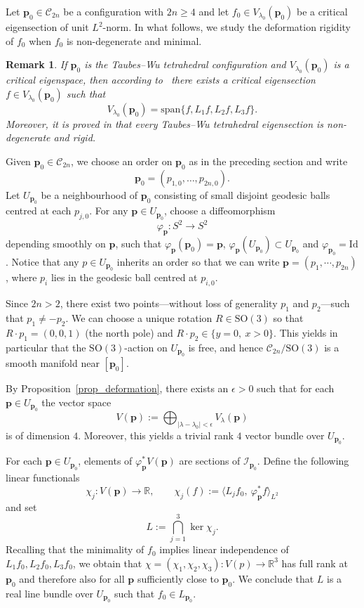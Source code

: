 \documentclass[11pt]{amsart}
\newtheorem*{remark}{Remark}
\newcommand{\MC}{\mathcal{C}}
\newcommand{\vp}{\varphi}
\newcommand{\MI}{\mathcal{I}}
\newcommand{\Id}{\mathrm{Id}}
\newcommand{\SO}{\mathrm{SO}}
\newcommand{\mbp}{\mathbf{p}}
\begin{document}
Let $\mbp_0\in \MC_{2n}$ be a configuration with $2n\geq 4$ and let $f_0\in V_{\lambda_0}(\mbp_0)$ be a critical eigensection of unit $L^2$-norm.  
In what follows, we study the deformation rigidity of $f_0$ when $f_0$ is non-degenerate and minimal.  

\begin{remark}
	If $\mbp_0$ is the Taubes--Wu tetrahedral configuration and $V_{\lambda_0}(\mbp_0)$ is a critical eigenspace, then according to~\cite[Section~5]{chen2024existence} there exists a critical eigensection $f\in V_{\lambda_0}(\mbp_0)$ such that
	\[
	V_{\lambda_0}(\mbp_0)=\mathrm{span}\{f, L_1 f, L_2 f, L_3 f\}.
	\]
	Moreover, it is proved in \cite{chen2024existence} that every Taubes--Wu tetrahedral eigensection is non-degenerate and rigid.
\end{remark}

Given $\mbp_0\in\mathcal{C}_{2n}$, we choose an order on $\mbp_0$ as in the preceding section and write
\[
\mbp_0=(p_{1,0},\ldots,p_{2n,0}).
\]
Let $U_{\mbp_0}$ be a neighbourhood of $\mbp_0$ consisting of small disjoint geodesic balls centred at each $p_{j,0}$.  
For any $\mbp\in U_{\mbp_0}$, choose a diffeomorphism
\[
\varphi_{\mbp}: S^2\to S^2
\]
depending smoothly on $\mbp$, such that $\varphi_{\mbp}(\mbp_0)=\mbp$, $\vp_{\mbp}(U_{\mbp_0})\subset U_{\mbp_0}$ and $\vp_{\mbp_0}=\Id$. 
Notice that any $p\in U_{\mbp_0}$ inherits an order so that we can write  $\mbp=(p_1,\cdots,p_{2n})$, where $p_i$ lies in the geodesic ball centred at $p_{i,0}$.

Since $2n>2$, there exist two points—without loss of generality $p_1$ and $p_2$—such that $p_1\neq -p_2$. We can choose a unique rotation $R\in \SO(3)$ so that $R\cdot p_1=(0,0,1)$ 
(the north pole) and $R\cdot p_2\in\{y=0,\ x>0\}$.  
This yields in particular that the $\SO(3)$-action on $U_{\mbp_0}$ is free, and hence $\mathcal C_{2n}/\SO(3)$
is a smooth manifold near $[\mbp_0]$.


By Proposition~\ref{prop_deformation}, there exists an $\epsilon>0$ such that for each $\mbp\in U_{\mbp_0}$ the vector space
\[
V(\mbp)
:= \bigoplus_{|\lambda-\lambda_0|<\epsilon} V_{\lambda}(\mbp)
\]
is of dimension $4$. 
Moreover, this yields a trivial rank $4$ vector bundle over  $U_{\mbp_0}$.

For each $\mbp\in U_{\mbp_0}$, elements of $\varphi_{\mbp}^*V(\mbp)$ are sections of $\MI_{\mbp_0}$.  
Define the following linear functionals
\begin{equation}
	\chi_j : V(\mbp)\to\mathbb{R},\qquad
	\chi_j(f):=\langle L_j f_0,\ \varphi_{\mbp}^* f\rangle_{L^2}
\end{equation}
and set
\[
L := \bigcap_{j=1}^3 \ker\chi_j .
\]
Recalling that the minimality of $f_0$ implies linear independence of $L_1 f_0, L_2 f_0, L_3 f_0$, we obtain  that $\chi=(\chi_1, \chi_2,\chi_3)\colon V(p)\to \mathbb R^3$ has full rank at $\mbp_0$ and therefore also for all $\mbp$ sufficiently close to $\mbp_0$. 
We conclude that $L$ is a real line bundle over $U_{\mbp_0}$ such that $f_0\in L_{\mbp_0}$. 
\end{document}
